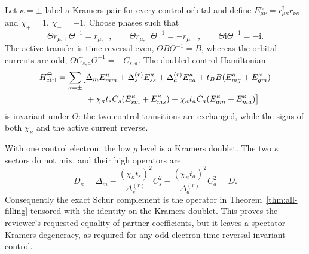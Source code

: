 \documentclass[11pt]{article}
\theoremstyle{definition}
\theoremstyle{remark}
\newcommand{\I}{\mathrm i}
\begin{document}
Let $\kappa=\pm$ label a Kramers pair for every control orbital and define $E_{\mu\nu}^{\kappa}=r_{\mu\kappa}^\dagger r_{\nu\kappa}$ and $\chi_+=1$, $\chi_-=-1$.  Choose phases such that
\begin{equation}
 \Theta r_{\mu,+}\Theta^{-1}=r_{\mu,-},
 \qquad
 \Theta r_{\mu,-}\Theta^{-1}=-r_{\mu,+},
 \qquad
 \Theta\I\Theta^{-1}=-\I.
 \label{eq:kramers-action}
\end{equation}
The active transfer is time-reversal even, $\Theta B\Theta^{-1}=B$, whereas the orbital currents are odd, $\Theta C_{s,a}\Theta^{-1}=-C_{s,a}$.  The doubled control Hamiltonian
\begin{equation}
\begin{aligned}
 H_{\rm ctrl}^{\Theta}=\sum_{\kappa=\pm}\bigl[&
 \Delta_mE_{mm}^{\kappa}+\Delta_s^{(r)}E_{ss}^{\kappa}+\Delta_a^{(r)}E_{aa}^{\kappa}
 +t_BB(E_{mg}^{\kappa}+E_{gm}^{\kappa})\\
 &+\chi_\kappa t_sC_s(E_{sm}^{\kappa}+E_{ms}^{\kappa})
 +\chi_\kappa t_aC_a(E_{am}^{\kappa}+E_{ma}^{\kappa})\bigr]
 \label{eq:kramers-H}
\end{aligned}
\end{equation}
is invariant under $\Theta$: the two control transitions are exchanged, while the signs of both $\chi_\kappa$ and the active current reverse.

With one control electron, the low $g$ level is a Kramers doublet.  The two $\kappa$ sectors do not mix, and their high operators are
\begin{equation}
 D_\kappa=\Delta_m-\frac{(\chi_\kappa t_s)^2}{\Delta_s^{(r)}}C_s^2
                    -\frac{(\chi_\kappa t_a)^2}{\Delta_a^{(r)}}C_a^2=D.
\end{equation}
Consequently the exact Schur complement is the operator in Theorem~\ref{thm:all-filling} tensored with the identity on the Kramers doublet.  This proves the reviewer's requested equality of partner coefficients, but it leaves a spectator Kramers degeneracy, as required for any odd-electron time-reversal-invariant control.
\end{document}
